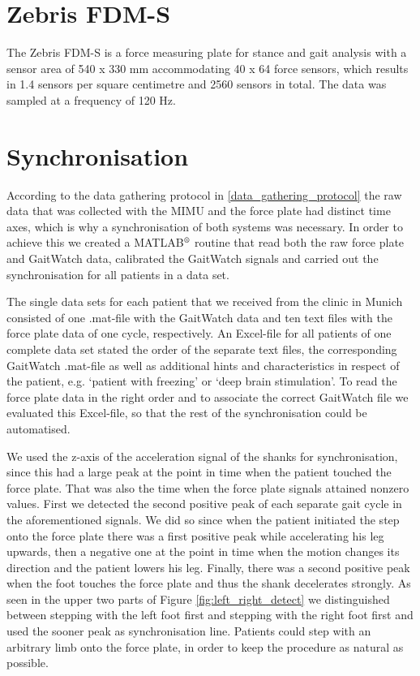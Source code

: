 \section{Zebris FDM-S}

The Zebris FDM-S \cite{zebris_force_plate_2013} is a force measuring plate for stance and gait analysis with a sensor area of 540 x 330 mm accommodating 40 x 64 force sensors, which results in 1.4 sensors per square centimetre and 2560 sensors in total. The data was sampled at a frequency of 120 Hz.

\section{Synchronisation}

According to the data gathering protocol in \ref{data_gathering_protocol} the raw data that was collected with the MIMU and the force plate had distinct time axes, which is why a synchronisation of both systems was necessary. In order to achieve this we created a MATLAB$\textsuperscript{\textregistered}$ routine that read both the raw force plate and GaitWatch data, calibrated the GaitWatch signals and carried out the synchronisation for all patients in a data set.

The single data sets for each patient that we received from the clinic in Munich consisted of one .mat-file with the GaitWatch data and ten text files with the force plate data of one cycle, respectively. An Excel-file for all patients of one complete data set stated the order of the separate text files, the corresponding GaitWatch .mat-file as well as additional hints and characteristics in respect of the patient, e.g. `patient with freezing' or `deep brain stimulation'. To read the force plate data in the right order and to associate the correct GaitWatch file we evaluated this Excel-file, so that the rest of the synchronisation could be automatised.

We used the z-axis of the acceleration signal of the shanks for synchronisation, since this had a large peak at the point in time when the patient touched the force plate. That was also the time when the force plate signals attained nonzero values.  First we detected the second positive peak of each separate gait cycle in the aforementioned signals. We did so since when the patient initiated the step onto the force plate there was a first positive peak while accelerating his leg upwards, then a negative one at the point in time when the motion changes its direction and the patient lowers his leg. Finally, there was a second positive peak when the foot touches the force plate and thus the shank decelerates strongly. As seen in the upper two parts of Figure \ref{fig:left_right_detect} we distinguished between stepping with the left foot first and stepping with the right foot first and used the sooner peak as synchronisation line. Patients could step with an arbitrary limb onto the force plate, in order to keep the procedure as natural as possible.

